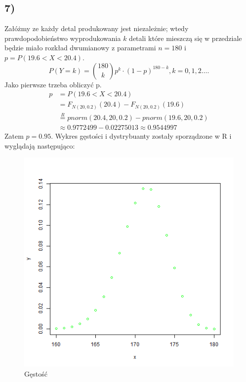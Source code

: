 \documentclass{article}
\begin{document}
{\subsection{7)}
Załóżmy ze każdy detal produkowany jest niezależnie; wtedy prawdopodobieństwo wyprodukowania $k$ detali 
które mieszczą się w przedziale będzie miało rozkład dwumianowy z parametrami $n = 180$ i $p = P(19.6<X<20.4)$.
\[
	P(Y=k) = \binom{180}{k}p^k\cdot(1-p)^{180-k}, k=0,1,2\dots.
\]
Jako pierwsze trzeba obliczyć p. 
\begin{align*}
p & = P(19.6<X<20.4) \\
& = F_{N(20,0.2)}(20.4) - F_{N(20,0.2)}(19.6)  \\
& \overset{R}{=} pnorm(20.4,20,0.2) - pnorm(19.6,20,0.2)  \\
& \approx 0.9772499 - 0.02275013 \approx 0.9544997
\end{align*}
Zatem $p = 0.95$. 
Wykres gęstości i dystrybuanty zostały sporządzone w R i wyglądają następująco:
\begin{figure}[h!]
\begin{center}
\includegraphics[height=0.35\textheight, angle=0]{"lab4zad1_d.png"}
\caption{Gęstość}
\end{center}
\end{figure}

}
\end{document}
